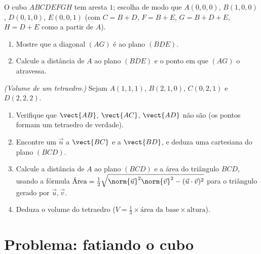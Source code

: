 \begin{exercise}[$\star\star\star$]\label{exo:g12:space:8}
O cubo $ABCDEFGH$ tem aresta $1$; escolha  de modo que
$A(0,0,0)$, $B(1,0,0)$, $D(0,1,0)$, $E(0,0,1)$ (com
$C = B + D$, $F = B + E$, $G = B + D + E$, $H = D + E$ como  a
partir de $A$).
\begin{enumerate}
  \item Mostre que a diagonal $(AG)$ é  ao plano $(BDE)$.
  \item Calcule a distância de $A$ ao plano $(BDE)$ e o ponto em que
        $(AG)$ o atravessa.
\end{enumerate}
\end{exercise}

\begin{exercise}[$\star\star\star$]\label{exo:g12:space:9}
\emph{(Volume de um tetraedro.)} Sejam $A(1,1,1)$, $B(2,1,0)$, $C(0,2,1)$
e $D(2,2,2)$.
\begin{enumerate}
  \item Verifique que $\vect{AB}$, $\vect{AC}$, $\vect{AD}$ não são
         (os pontos formam um tetraedro de verdade).
  \item Encontre um  $\vec n$  a $\vect{BC}$ e a
        $\vect{BD}$, e deduza uma  cartesiana do plano $(BCD)$.
  \item Calcule a distância de $A$ ao plano $(BCD)$ e a área do triângulo
        $BCD$, usando a fórmula
        $\text{Área} = \frac12\sqrt{\norm{\vec u}^2\norm{\vec v}^2 -
        (\vec u \cdot \vec v)^2}$ para o triângulo gerado por
        $\vec u, \vec v$.
  \item Deduza o volume do tetraedro
        ($V = \frac13 \times \text{área da base} \times \text{altura}$).
\end{enumerate}
\end{exercise}

\section{Problema: fatiando o cubo}


